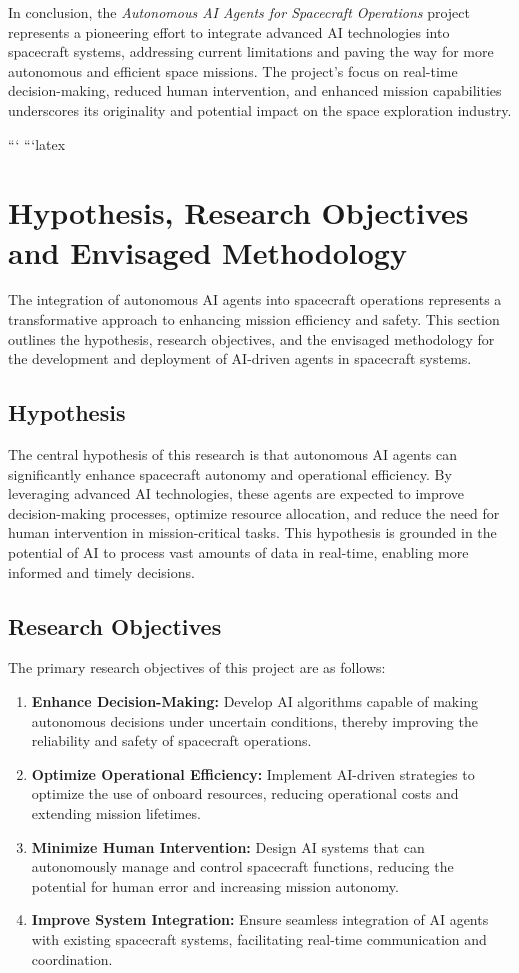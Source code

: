 \documentclass[a4paper, 11pt]{article}
\begin{document}
In conclusion, the \textit{Autonomous AI Agents for Spacecraft Operations} project represents a pioneering effort to integrate advanced AI technologies into spacecraft systems, addressing current limitations and paving the way for more autonomous and efficient space missions. The project's focus on real-time decision-making, reduced human intervention, and enhanced mission capabilities underscores its originality and potential impact on the space exploration industry.



```
```latex
\section{Hypothesis, Research Objectives and Envisaged Methodology}

The integration of autonomous AI agents into spacecraft operations represents a transformative approach to enhancing mission efficiency and safety. This section outlines the hypothesis, research objectives, and the envisaged methodology for the development and deployment of AI-driven agents in spacecraft systems.

\subsection{Hypothesis}

The central hypothesis of this research is that autonomous AI agents can significantly enhance spacecraft autonomy and operational efficiency. By leveraging advanced AI technologies, these agents are expected to improve decision-making processes, optimize resource allocation, and reduce the need for human intervention in mission-critical tasks. This hypothesis is grounded in the potential of AI to process vast amounts of data in real-time, enabling more informed and timely decisions.

\subsection{Research Objectives}

The primary research objectives of this project are as follows:

\begin{enumerate}
    \item \textbf{Enhance Decision-Making:} Develop AI algorithms capable of making autonomous decisions under uncertain conditions, thereby improving the reliability and safety of spacecraft operations.
    \item \textbf{Optimize Operational Efficiency:} Implement AI-driven strategies to optimize the use of onboard resources, reducing operational costs and extending mission lifetimes.
    \item \textbf{Minimize Human Intervention:} Design AI systems that can autonomously manage and control spacecraft functions, reducing the potential for human error and increasing mission autonomy.
    \item \textbf{Improve System Integration:} Ensure seamless integration of AI agents with existing spacecraft systems, facilitating real-time communication and coordination.
\end{enumerate}
\end{document}
